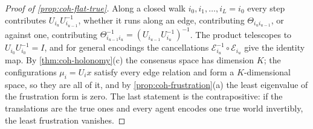 \begin{proof}[Proof of \cref{prop:coh-flat-true}]
Along a closed walk $i_0,i_1,\dots,i_L=i_0$ every step contributes $U_{i_u}U_{i_{u-1}}^{-1}$, whether it runs along an edge, contributing $\Theta_{i_ui_{u-1}}$, or against one, contributing $\Theta_{i_{u-1}i_u}^{-1}=(U_{i_{u-1}}U_{i_u}^{-1})^{-1}$. The product telescopes to $U_{i_0}U_{i_0}^{-1}=I$, and for general encodings the cancellations $\mathcal E_{i_u}^{-1}\circ\mathcal E_{i_u}$ give the identity map. By \cref{thm:coh-holonomy}(c) the consensus space has dimension $K$; the configurations $\mu_i=U_ix$ satisfy every edge relation and form a $K$-dimensional space, so they are all of it, and by \cref{prop:coh-frustration}(a) the least eigenvalue of the frustration form is zero. The last statement is the contrapositive: if the translations are the true ones and every agent encodes one true world invertibly, the least frustration vanishes.
\end{proof}

